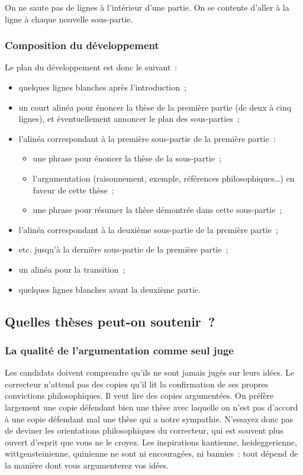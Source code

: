 \documentclass[a4paper]{article}
\begin{document}
On ne saute pas de lignes à l'intérieur d'une partie. On se contente
d'aller à la ligne à chaque nouvelle sous-partie.

\subsubsection{Composition du développement}
\label{sec-3-1-4}

Le plan du développement est donc le suivant :

\begin{itemize}
\item quelques lignes blanches après l'introduction ;
\item un court alinéa pour énoncer la thèse de la première partie (de deux à
cinq lignes), et éventuellement annoncer le plan des sous-parties ;
\item l'alinéa correspondant à la première sous-partie de la première partie :
\begin{itemize}
\item une phrase pour énoncer la thèse de la sous-partie ;
\item l'argumentation (raisonnement, exemple, références
philosophiques\ldots{}) en faveur de cette thèse ;
\item une phrase pour résumer la thèse démontrée dans cette sous-partie ;
\end{itemize}
\item l'alinéa correspondant à la deuxième sous-partie de la première
partie ;
\item etc. jusqu'à la dernière sous-partie de la première partie ;
\item un alinéa pour la transition ;
\item quelques lignes blanches avant la deuxième partie.
\end{itemize}

\subsection{Quelles thèses peut-on soutenir ?}
\label{sec-3-2}

\subsubsection{La qualité de l'argumentation comme seul juge}
\label{sec-3-2-1}

Les candidats doivent comprendre qu'ils ne sont jamais jugés sur leurs
idées. Le correcteur n'attend pas des copies qu'il lit la confirmation
de ses propres convictions philosophiques. Il veut lire des copies
argumentées. On préfère largement une copie défendant bien une thèse
avec laquelle on n'est pas d'accord à une copie défendant mal une thèse
qui a notre sympathie. N'essayez donc pas de deviner les orientations
philosophiques du correcteur, qui est souvent plus ouvert d'esprit que
vous ne le croyez. Les inspirations kantienne, heideggerienne,
wittgensteinienne, quinienne ne sont ni encouragées, ni bannies : tout
dépend de la manière dont vous argumenterez vos idées.
\end{document}
